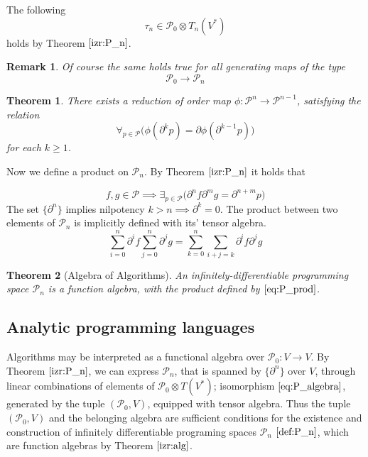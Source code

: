 \documentclass{article}
\newcommand{\dP}{\mathcal{P}}
\newcommand{\D}{\partial}
\newcommand{\sumd}{\tau}
\newtheorem{izrek}{Theorem}[section]
\newtheorem{opomba}{Remark}[section]
\begin{document}
    The following
     \begin{equation}
     	\sumd_n\in\dP_0\otimes T_n(V^*)
     \end{equation}
   	holds by Theorem $\ref{izr:P_n}$.
        \begin{opomba}
        Of course the same holds true for all generating maps of the type
        $$\dP_0\to\dP_n$$
        \end{opomba}
        
\begin{izrek}\label{izr:reductionMapSingle}
There exists a reduction of order map $\phi:\dP^n\to\dP^{n-1}$, satisfying the relation
\begin{equation}\label{eq:reductionMapSingle}
\forall_{p\in\dP}\Big(\phi(\D^kp)=\D\phi(\D^{k-1}p)\Big)
\end{equation}
for each $k\ge 1$.
\end{izrek}        

Now we define a product on $\dP_n$. By Theorem $\ref{izr:P_n}$ it holds that

\begin{equation}
	f,g\in\dP\implies\exists_{p\in\dP}\Big(\D^nf\D^mg=\D^{n+m}p\Big)
\end{equation}
The set $\{\D^n\}$ implies nilpotency $k>n\implies\D^k=0$. The product between two elements of $\dP_n$ is implicitly defined with its' tensor algebra. 
\begin{equation}\label{eq:P_prod}
	\sum\limits_{i=0}^{n}\D^if\sum\limits_{j=0}^{n}\D^jg=\sum\limits_{k=0}^{n}\sum\limits_{i+j=k}\D^if\D^jg
\end{equation}

\begin{izrek}[Algebra of Algorithms]\label{izr:alg}
An infinitely-differentiable programming space $\dP_n$ is a function algebra, with the product defined by $\eqref{eq:P_prod}$.
\end{izrek}

\subsection{Analytic programming languages}
Algorithms may be interpreted as a functional algebra over $\dP_0:V\to V$.
By Theorem $\ref{izr:P_n}$, we can express $\dP_n$, that is spanned by $\{\D^n\}$ over $V$, through linear combinations of elements of $\dP_0\otimes T(V^*)$; isomorphism $\eqref{eq:P_algebra}$, generated by the tuple $(\dP_0,V)$, equipped with tensor algebra. Thus the tuple  $(\dP_0,V)$ and the belonging algebra are sufficient conditions for the existence and construction of infinitely differentiable programing spaces $\dP_n$ $\eqref{def:P_n}$, which are function algebras by Theorem $\ref{izr:alg}$.
\end{document}
